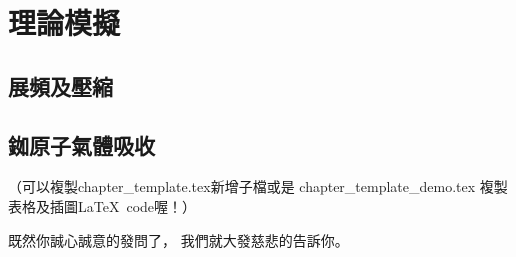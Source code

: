 \documentclass[class=NCU_thesis, crop=false]{standalone}
\begin{document}
\chapter{理論模擬}
\section{展頻及壓縮}
\section{銣原子氣體吸收}

（可以複製chapter\_template.tex新增子檔或是
chapter\_template\_demo.tex 複製表格及插圖\LaTeX\ code喔！）

既然你誠心誠意的發問了，
我們就大發慈悲的告訴你。
\end{document}

